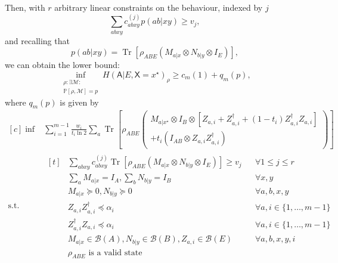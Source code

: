 \documentclass[10pt, a4paper]{article}
\numberwithin{equation}{section} %
\theoremstyle{definition}
\theoremstyle{plain}
\newcommand{\dintv}[2]{\mathopen\{#1,\ldots,#2\mathclose\}}
\newcommand{\?}{\mathrel{?}} %
\newcommand{\Tr}[2][]{\mathop{\mathrm{Tr}#1}\left[ #2 \right]} %
\newcommand{\sM}{\mathcal{M}}
\newcommand{\sB}{\mathcal{B}}
\newcommand{\crv}[1]{\mathsf{#1}}
\newcommand{\behav}[2]{\mathbb{P}\left[#1, #2\right]}
\begin{document}
    Then, with \(r\) arbitrary linear constraints on the behaviour, indexed by \(j\)
    \begin{equation} \sum_{abxy} c^{(j)}_{abxy} p(ab|xy) \geq v_j, \end{equation}
    and recalling that
    \[ p(ab|xy) = \Tr{\rho_{A B E} \left(M_{a|x} \otimes N_{b|y} \otimes I_{E}\right) }, \]
    we can obtain the lower bound:
    \begin{equation}
      \inf_{\substack{\rho: \exists \sM : \\ \behav{\rho}{ \sM} = p}} H{(\crv{A}|E, \crv{X}=x^{\star})}_{\rho} \geq c_m(1) + q_m(p),
    \end{equation}
    where \(q_m(p)\) is given by
    \begin{equation}
      \begin{aligned}[c]
        \inf & \sum_{i=1}^{m-1} \frac{w_i}{t_i \ln 2} \sum_a \Tr{ 
          \rho_{A B E} \left(
            \begin{gathered}
              M_{a|x^{\star}} \otimes I_{B} \otimes \left[ Z_{a,i} + Z_{a,i}^{\dagger} + (1-t_i)  Z_{a,i}^{\dagger}Z_{a,i} \right] \\
              + t_i \left( I_{A B} \otimes Z_{a,i}Z_{a,i}^{\dagger}\right) 
            \end{gathered}
          \right)
        } \\
          \text{s.t.} & \begin{aligned}[t] 
            & \sum_{abxy} c^{(j)}_{abxy} \Tr{\rho_{A B E} \left(M_{a|x} \otimes N_{b|y} \otimes I_{E}\right) } \geq v_j & & \forall 1 \leq j \leq r \\
            & \sum_{a} M_{a|x} = I_{A}, \sum_{b} N_{b|y} = I_{B} & & \forall x, y \\
            & M_{a|x} \succeq 0, N_{b|y} \succeq 0 & & \forall a, b, x, y \\
            & Z_{a,i} Z_{a,i}^{\dagger} \preceq \alpha_i & & \forall a, i \in \dintv{1}{m-1} \\
            & Z_{a,i}^{\dagger} Z_{a,i} \preceq \alpha_i & & \forall a, i \in \dintv{1}{m-1} \\
            & M_{a|x} \in \sB(A), N_{b|y} \in \sB(B), Z_{a,i} \in \sB(E) & & \forall a, b, x, y, i \\
            & \rho_{A B E} \text{ is a valid state} & &
          \end{aligned}
          \end{aligned}
        \end{equation}
\end{document}
